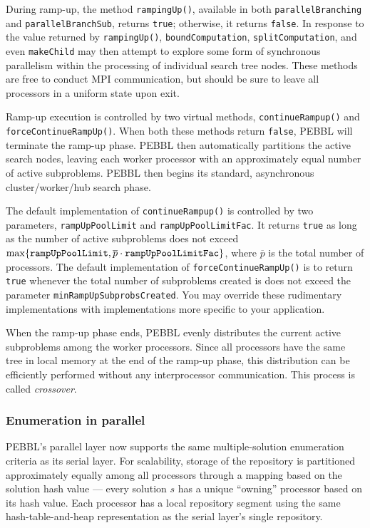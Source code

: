 During ramp-up, the method \texttt{rampingUp()}, available in both
\texttt{parallelBranching} and \texttt{parallelBranchSub}, returns
\texttt{true}; otherwise, it returns \texttt{false}.  In response to
the value returned by \texttt{rampingUp()}, \texttt{boundComputation},
\texttt{splitComputation}, and even \texttt{makeChild} may then
attempt to explore some form of synchronous parallelism within
the processing of
individual search tree nodes.  These methods are free to conduct
MPI communication, but should be sure to leave all
processors in a uniform state upon exit.

Ramp-up execution is controlled by two virtual methods,
\texttt{continueRampup()} and
\texttt{force\linebreak[0]ContinueRampUp()}.  When both these methods
return \texttt{false}, PEBBL will terminate the ramp-up phase.  PEBBL
then automatically partitions the active search nodes, leaving each
worker processor with an approximately equal number of active
subproblems.  PEBBL then begins its standard, asynchronous
cluster/worker/hub search phase.

The default implementation of \texttt{continueRampup()} is controlled
by two parameters, \texttt{ramp\linebreak[0]UpPoolLimit} and
\texttt{rampUpPoolLimitFac}.  It returns \texttt{true} as long as the
number of active subproblems does not exceed $\max\{\mbox{\tt
rampUpPoolLimit}, \overline{p}\cdot\mbox{\tt rampUpPoolLimitFac}\}$,
where $\overline{p}$ is the total number of processors.  The default
implementation of \texttt{forceContinueRampUp()} is to return
\texttt{true} whenever the total number of subproblems created is does
not exceed the parameter \texttt{minRampUpSubprobsCreated}.  You may
override these rudimentary implementations with implementations more
specific to your application.

When the ramp-up phase ends, PEBBL evenly distributes the current
active subproblems among the worker processors.  Since all processors
have the same tree in local memory at the end of the ramp-up phase,
this distribution can be efficiently performed without any
interprocessor communication.  This process is called
\emph{crossover}. 


\subsubsection{Enumeration in parallel}

PEBBL's parallel layer now supports the same multiple-solution
enumeration criteria as its serial layer.  For scalability, storage of
the repository is partitioned approximately equally among all
processors through a mapping based on the solution hash value ---
every solution $s$ has a unique ``owning'' processor based on its hash
value.  Each processor has a local repository segment using the same
hash-table-and-heap representation as the serial layer's single
repository.

